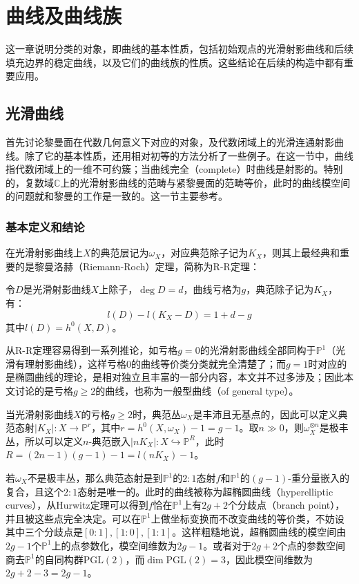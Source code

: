 \chapter{曲线及曲线族}
这一章说明分类的对象，即曲线的基本性质，包括初始观点的光滑射影曲线和后续填充边界的稳定曲线，以及它们的曲线族的性质。这些结论在后续的构造中都有重要应用。
\section{光滑曲线}
首先讨论黎曼面在代数几何意义下对应的对象，及代数闭域上的光滑连通射影曲线。除了它的基本性质，还用相对初等的方法分析了一些例子。在这一节中，曲线指代数闭域上的一维不可约簇；当曲线完全（complete）时曲线是射影的。特别的，复数域$ \mathbb{C} $上的光滑射影曲线的范畴与紧黎曼面的范畴等价，此时的曲线模空间的问题就和黎曼的工作是一致的。这一节主要参考\cite{GTM52}。
\subsection{基本定义和结论}
在光滑射影曲线上$ X $的典范层记为$ \omega_X $，对应典范除子记为$ K_X $，则其上最经典和重要的是黎曼洛赫（Riemann-Roch）定理，简称为R-R定理：
\begin{theorem}\label{R-R}
	令$ D $是光滑射影曲线$ X $上除子，$ \deg D=d $，曲线亏格为$ g $，典范除子记为$ K_X $，有：
	$$ l(D)-l(K_X-D)=1+d-g $$
	其中$ l(D)=h^0(X,D) $。
\end{theorem}

从R-R定理容易得到一系列推论，如亏格$ g=0 $的光滑射影曲线全部同构于$ \mathbb{P}^1 $（光滑有理射影曲线），这样亏格$ 0 $的曲线等价类分类就完全清楚了；而$ g=1 $时对应的是椭圆曲线的理论，是相对独立且丰富的一部分内容，本文并不过多涉及；因此本文讨论的是亏格$ g\geqslant2 $的曲线，也称为一般型曲线（of general type）。

当光滑射影曲线$ X $的亏格$ g\geqslant 2 $时，典范丛$ \omega_X $是丰沛且无基点的，因此可以定义典范态射$ |K_X|:X\to \mathbb{P}^r $，其中$ r=h^0(X,\omega_X)-1=g-1 $。取$ n\gg0 $，则$ \omega_X^{\otimes n} $是极丰丛，所以可以定义$ n $-典范嵌入$ |nK_X|:X\hookrightarrow \mathbb{P}^{R} $，此时$ R=(2n-1)(g-1)-1=l(nK_X)-1 $。

若$ \omega_X $不是极丰丛，那么典范态射是到$ \mathbb{P}^1 $的$ 2:1 $态射$ f $和$ \mathbb{P}^1 $的$ (g-1)$-重分量嵌入的复合，且这个$ 2:1 $态射是唯一的。此时的曲线被称为超椭圆曲线（hyperelliptic curves），从Hurwitz定理可以得到$ f $恰在$ \mathbb{P}^1 $上有$ 2g+2 $个分歧点（branch point），并且被这些点完全决定。可以在$ \mathbb{P}^1 $上做坐标变换而不改变曲线的等价类，不妨设其中三个分歧点是$ [0:1],[1:0],[1:1] $。这样粗糙地说，超椭圆曲线的模空间由$ 2g-1 $个$ \mathbb{P}^1 $上的点参数化，模空间维数为$ 2g-1 $。或者对于$ 2g+2 $个点的参数空间商去$ \mathbb{P}^1 $的自同构群$ \mathrm{PGL}(2) $，而$ \dim \mathrm{PGL}(2)=3 $，因此模空间维数为$ 2g+2-3=2g-1 $。

